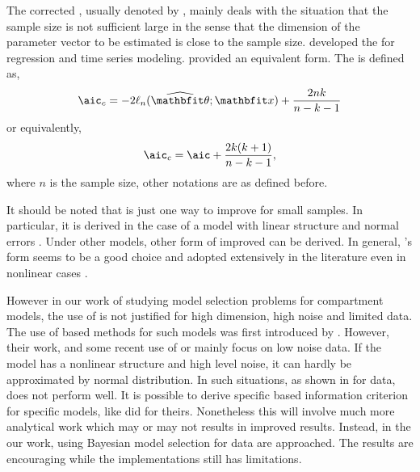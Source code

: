 The corrected \aic, usually denoted by \aicc, mainly deals with the situation
that the sample size is not sufficient large in the sense that the dimension
of the parameter vector to be estimated is close to the sample size.
\textcite{Hurvich1989} developed the \aicc for regression and time series
modeling. \textcite{Sugiura1978} provided an equivalent form. The \aicc is
defined as,
\begin{equation}
  \text{\aicc} = -2\ell_n(\hbth;\bfx) + \frac{2nk}{n-k-1}
\end{equation}
or equivalently,
\begin{equation}
  \text{\aicc} = \text{\aic} + \frac{2k(k+1)}{n-k-1},
\end{equation}
where $n$ is the sample size, other notations are as defined before.

It should be noted that \aicc is just one way to improve \aic for small
samples. In particular, it is derived in the case of a model with linear
structure and normal errors \parencite{Hurvich1989, Burnham2002}. Under other
models, other form of improved \aic can be derived. In general,
\textcite{Hurvich1989}'s form seems to be a good choice and adopted
extensively in the literature even in nonlinear cases
\parencite[e.g.][]{Turkheimer2003}.

However in our work of studying model selection problems for compartment
models, the use of \aicc is not justified for high dimension, high noise and
limited data. The use of \aic based methods for such models was first
introduced by \textcite{Hawkins1986}. However, their work, and some recent use
of \aic or \aicc mainly focus on low noise data. If the model has a nonlinear
structure and high level noise, it can hardly be approximated by normal
distribution. In such situations, as shown in \textcite{Zhou2011} for \pet
data, \aicc does not perform well. It is possible to derive specific \aic
based information criterion for specific models, like \textcite{Hurvich1989}
did for theirs. Nonetheless this will involve much more analytical work which
may or may not results in improved results. Instead, in the our work, using
Bayesian model selection for \pet data are approached. The results are
encouraging while the implementations still has limitations.
